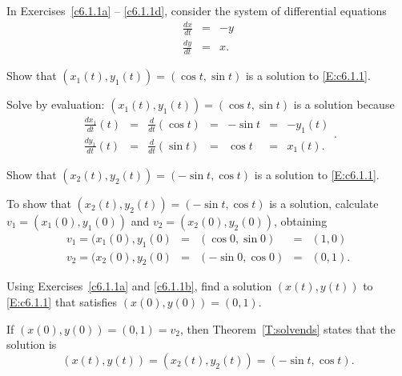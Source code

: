 \documentclass{ximera}
\begin{document}
\noindent In Exercises~\ref{c6.1.1a} -- \ref{c6.1.1d}, consider the system of
differential equations
\begin{equation} \label{E:c6.1.1}
\begin{array}{rcr}
\frac{dx}{dt}  & = & -y \\
\frac{dy}{dt}  & = &  x.
\end{array}
\end{equation}
\begin{exercise} \label{c6.1.1a}
Show that $(x_1(t),y_1(t)) = (\cos t,\sin t)$ is a solution to \eqref{E:c6.1.1}.

\begin{solution}

Solve by evaluation:
$(x_1(t),y_1(t)) = (\cos t, \sin t)$
is a solution because
\[ \begin{array}{ccccccc}
\frac{dx_1}{dt}(t) & = & \frac{d}{dt}(\cos t) & = & -\sin t & = & -y_1(t)
\\ \frac{dy_1}{dt}(t) & = & \frac{d}{dt}(\sin t) & = & \cos t & = & x_1(t).
\end{array}. \]

\end{solution}
\end{exercise}
\begin{exercise} \label{c6.1.1b}
Show that $(x_2(t),y_2(t)) = (-\sin t,\cos t)$ is a solution to \eqref{E:c6.1.1}.

\begin{solution}
To show that $(x_2(t),y_2(t)) = (-\sin t, \cos t)$
is a solution, calculate $v_1 = (x_1(0),y_1(0))$ and
$v_2 = (x_2(0),y_2(0))$, obtaining
\[
\begin{array}{ccccl}
v_1 = (x_1(0),y_1(0) & = & (\cos 0,\sin 0) & = & (1,0) \\
v_2 = (x_2(0),y_2(0) & = & (-\sin 0,\cos 0) & = & (0,1).
\end{array}
\]

\end{solution}
\end{exercise}
\begin{exercise} \label{c6.1.1c}
Using Exercises~\ref{c6.1.1a} and \ref{c6.1.1b}, find a solution $(x(t),y(t))$
to \eqref{E:c6.1.1} that satisfies $(x(0),y(0)) = (0,1)$.

\begin{solution}

If $(x(0),y(0)) = (0,1) = v_2$, then Theorem~\ref{T:solvends} states
that the solution is
\[
(x(t),y(t)) = (x_2(t),y_2(t)) = (-\sin t,\cos t).
\]

\end{solution}
\end{exercise}
\end{document}
